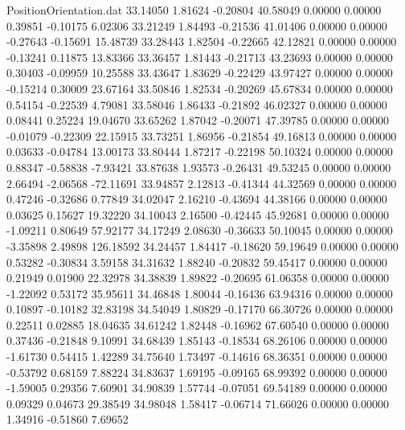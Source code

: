 \begin{filecontents}{PositionOrientation.dat}
  33.14050    1.81624   -0.20804    40.58049    0.00000    0.00000    0.39851   -0.10175    6.02306
  33.21249    1.84493   -0.21536    41.01406    0.00000    0.00000   -0.27643   -0.15691   15.48739
  33.28443    1.82504   -0.22665    42.12821    0.00000    0.00000   -0.13241    0.11875   13.83366
  33.36457    1.81443   -0.21713    43.23693    0.00000    0.00000    0.30403   -0.09959   10.25588
  33.43647    1.83629   -0.22429    43.97427    0.00000    0.00000   -0.15214    0.30009   23.67164
  33.50846    1.82534   -0.20269    45.67834    0.00000    0.00000    0.54154   -0.22539    4.79081
  33.58046    1.86433   -0.21892    46.02327    0.00000    0.00000    0.08441    0.25224   19.04670
  33.65262    1.87042   -0.20071    47.39785    0.00000    0.00000   -0.01079   -0.22309   22.15915
  33.73251    1.86956   -0.21854    49.16813    0.00000    0.00000    0.03633   -0.04784   13.00173
  33.80444    1.87217   -0.22198    50.10324    0.00000    0.00000    0.88347   -0.58838   -7.93421
  33.87638    1.93573   -0.26431    49.53245    0.00000    0.00000    2.66494   -2.06568  -72.11691
  33.94857    2.12813   -0.41344    44.32569    0.00000    0.00000    0.47246   -0.32686    0.77849
  34.02047    2.16210   -0.43694    44.38166    0.00000    0.00000    0.03625    0.15627   19.32220
  34.10043    2.16500   -0.42445    45.92681    0.00000    0.00000   -1.09211    0.80649   57.92177
  34.17249    2.08630   -0.36633    50.10045    0.00000    0.00000   -3.35898    2.49898  126.18592
  34.24457    1.84417   -0.18620    59.19649    0.00000    0.00000    0.53282   -0.30834    3.59158
  34.31632    1.88240   -0.20832    59.45417    0.00000    0.00000    0.21949    0.01900   22.32978
  34.38839    1.89822   -0.20695    61.06358    0.00000    0.00000   -1.22092    0.53172   35.95611
  34.46848    1.80044   -0.16436    63.94316    0.00000    0.00000    0.10897   -0.10182   32.83198
  34.54049    1.80829   -0.17170    66.30726    0.00000    0.00000    0.22511    0.02885   18.04635
  34.61242    1.82448   -0.16962    67.60540    0.00000    0.00000    0.37436   -0.21848    9.10991
  34.68439    1.85143   -0.18534    68.26106    0.00000    0.00000   -1.61730    0.54415    1.42289
  34.75640    1.73497   -0.14616    68.36351    0.00000    0.00000   -0.53792    0.68159    7.88224
  34.83637    1.69195   -0.09165    68.99392    0.00000    0.00000   -1.59005    0.29356    7.60901
  34.90839    1.57744   -0.07051    69.54189    0.00000    0.00000    0.09329    0.04673   29.38549
  34.98048    1.58417   -0.06714    71.66026    0.00000    0.00000    1.34916   -0.51860    7.69652

\end{filecontents}
